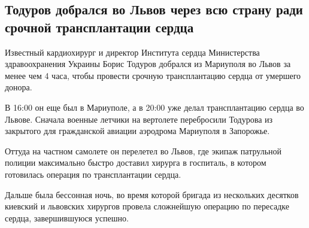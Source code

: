  
 
 
 
 
 
\subsection{Тодуров добрался во Львов через всю страну ради срочной трансплантации сердца}
\label{sec:22_11_2020.fb.livanov_jurij.1.todurov_lvov}


Известный кардиохирург и директор Института сердца Министерства здравоохранения
Украины Борис Тодуров добрался из Мариуполя во Львов за менее чем 4 часа, чтобы
провести срочную трансплантацию сердца от умершего донора.

В 16:00 он еще был в Мариуполе, а в 20:00 уже делал трансплантацию сердца во Львове. Сначала военные летчики на вертолете перебросили Тодурова из закрытого для гражданской авиации аэродрома Мариуполя в Запорожье.

Оттуда на частном самолете он перелетел во Львов, где экипаж патрульной полиции
максимально быстро доставил хирурга в госпиталь, в котором готовилась операция
по трансплантации сердца.

Дальше была бессонная ночь, во время которой бригада из нескольких десятков
киевский и львовских хирургов провела сложнейшую операцию по пересадке сердца,
завершившуюся успешно.
